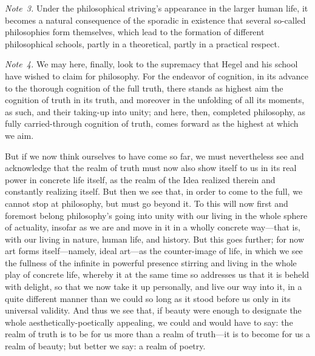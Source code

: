 \documentclass[12pt,a4paper]{book}
\begin{document}
{\small\emph{Note~3.} Under the philosophical striving's appearance in the larger human
life, it becomes a natural consequence of the sporadic in existence that several
so-called philosophies form themselves, which lead to the formation of different
philosophical schools, partly in a theoretical, partly in a practical respect.\par}

{\small\emph{Note~4.} We may here, finally, look to the supremacy that Hegel and his
school have wished to claim for philosophy. For the endeavor of cognition, in its
advance to the thorough cognition of the full truth, there stands as highest aim the
cognition of truth in its truth, and moreover in the unfolding of all its moments, as
such, and their taking-up into unity; and here, then, completed philosophy, as fully
carried-through cognition of truth, comes forward as the highest at which we aim.\par}

But if we now think ourselves to have come so far, we must nevertheless see and
acknowledge that the realm of truth must now also show itself to us in its real power in
concrete life itself, as the realm of the Idea realized therein and constantly realizing
itself. But then we see that, in order to come to the full, we cannot stop at philosophy,
but must go beyond it. To this will now first and foremost belong philosophy's going into
unity with our living in the whole sphere of actuality, insofar as we are and move in it
in a wholly concrete way---that is, with our living in nature, human life, and history.
But this goes further; for now art forms itself---namely, ideal art---as the
counter-image of life, in which we see the fullness of the infinite in powerful presence
stirring and living in the whole play of concrete life, whereby it at the same time so
addresses us that it is beheld with delight, so that we now take it up personally, and
live our way into it, in a quite different manner than we could so long as it stood
before us only in its universal validity. And thus we see that, if beauty were enough to
designate the whole aesthetically-poetically appealing, we could and would have to say:
the realm of truth is to be for us more than a realm of truth---it is to become for us a
realm of beauty; but better we say: a realm of poetry.
\end{document}
